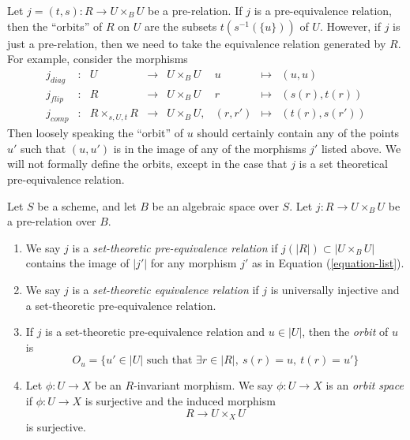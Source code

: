 \noindent
Let $j = (t, s) : R \to U \times_B U$ be a pre-relation.
If $j$ is a pre-equivalence relation, then the ``orbits'' of $R$ on $U$
are the subsets $t(s^{-1}(\{u\}))$ of $U$. However, if $j$ is just a
pre-relation, then we need to take the equivalence relation generated
by $R$. For example, consider the morphisms
\begin{equation}
\label{equation-list}
\begin{matrix}
j_{diag} &
: &
U &
\longrightarrow &
U \times_B U &
u &
\longmapsto &
(u, u) \\
j_{flip} &
: &
R &
\longrightarrow &
U \times_B U &
r &
\longmapsto &
(s(r), t(r)) \\
j_{comp} &
: &
R \times_{s, U, t} R &
\longrightarrow &
U \times_B U, &
(r, r') &
\longmapsto &
(t(r), s(r'))
\end{matrix}
\end{equation}
Then loosely speaking the ``orbit'' of $u$ should certainly contain any
of the points $u'$ such that $(u, u')$ is in the image of any
of the morphisms $j'$ listed above. We will not formally define the
orbits, except in the case that $j$ is a set theoretical pre-equivalence
relation.

\begin{definition}
\label{definition-orbits}
Let $S$ be a scheme, and let $B$ be an algebraic space over $S$.
Let $j : R \to U \times_B U$ be a pre-relation over $B$.
\begin{enumerate}
\item We say $j$ is a {\it set-theoretic pre-equivalence relation}
if $j(|R|) \subset |U \times_B U|$ contains the image of $|j'|$ for any
morphism $j'$ as in Equation (\ref{equation-list}).
\item We say $j$ is a {\it set-theoretic equivalence relation}
if $j$ is universally injective and a set-theoretic pre-equivalence
relation.
\item If $j$ is a set-theoretic pre-equivalence relation
and $u \in |U|$, then the {\it orbit} of $u$ is
$$
O_u =
\{u' \in |U| \text{ such that } \exists r \in |R|,\ s(r) = u,\ t(r) = u'\}
$$
\item Let $\phi : U \to X$ be an $R$-invariant morphism.
We say $\phi : U \to X$ is an {\it orbit space} if $\phi : U \to X$
is surjective and the induced morphism
$$
R \longrightarrow U \times_X U
$$
is surjective.
\end{enumerate}
\end{definition}

